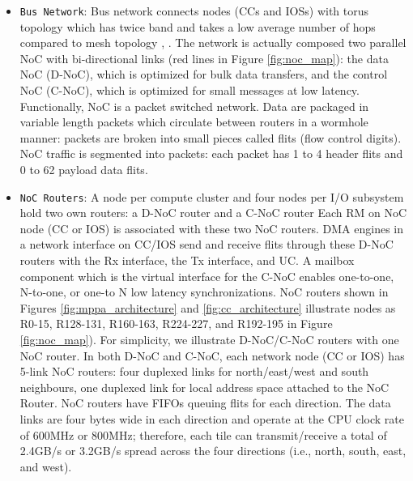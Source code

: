 \documentclass{sig-alternate-05-2015}
\begin{document}
\begin{itemize}
\item \verb+Bus Network+:
Bus network connects nodes (CCs and IOSs) with torus topology \cite{dally2001route}
which has twice band and takes a low average number of hops compared to mesh topology \cite{vangal200780}, \cite{taylor2002raw}.
The network is actually composed two parallel NoC with bi-directional links (red lines in Figure \ref{fig:noc_map}):
the data NoC (D-NoC), which is optimized for bulk data transfers, and the control NoC (C-NoC), which is optimized for small messages at low latency.
Functionally, NoC is a packet switched network.
Data are packaged in variable length packets which circulate between routers in a wormhole manner:
packets are broken into small pieces called flits (flow control digits).
NoC traffic is segmented into packets: each packet has 1 to 4 header flits and 0 to 62 payload data flits.

\item \verb+NoC Routers+:
A node per compute cluster and four nodes per I/O subsystem hold two own routers: a D-NoC router and a C-NoC router
Each RM on NoC node (CC or IOS) is associated with these two NoC routers.
DMA engines in a network interface on CC/IOS send and receive flits through these D-NoC routers with the Rx interface, the Tx interface, and UC.
A mailbox component which is the virtual interface for the C-NoC enables one-to-one, N-to-one, or one-to N low latency synchronizations.
NoC routers shown in Figures \ref{fig:mppa_architecture} and \ref{fig:cc_architecture} illustrate nodes as R0-15, R128-131, R160-163, R224-227, and R192-195 in Figure \ref{fig:noc_map}).
For simplicity, we illustrate D-NoC/C-NoC routers with one NoC router.
In both D-NoC and C-NoC, each network node (CC or IOS) has 5-link NoC routers:
four duplexed links for north/east/west and south neighbours, one duplexed link for local address space attached to the NoC Router.
NoC routers have FIFOs queuing flits for each direction.
The data links are four bytes wide in each direction and operate at the CPU clock rate of 600MHz or 800MHz;
therefore, each tile can transmit/receive a total of 2.4GB/s or 3.2GB/s spread across the four directions (i.e., north, south, east, and west).
\end{itemize}
\end{document}
